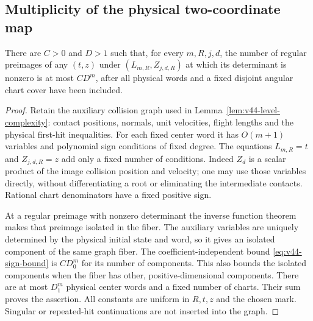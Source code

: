 \subsection{Multiplicity of the physical two-coordinate map}
\begin{lemma}
\label{lem:v61-clearance-multiplicity}
There are $C>0$ and $D>1$ such that, for every $m,R,j,d$, the number
of regular preimages of any $(t,z)$ under
$(L_{m,R},Z_{j,d,R})$ at which its determinant is nonzero is at most
$CD^m$, after all physical words and a fixed disjoint angular chart
cover have been included.
\end{lemma}
\begin{proof}
Retain the auxiliary collision graph used in
Lemma~\ref{lem:v44-level-complexity}: contact positions, normals,
unit velocities, flight lengths and the physical first-hit inequalities.
For each fixed center word it has $O(m+1)$ variables and polynomial
sign conditions of fixed degree. The equations $L_{m,R}=t$ and
$Z_{j,d,R}=z$ add only a fixed number of conditions. Indeed $Z_d$
is a scalar product of the image collision position and velocity;
one may use those variables directly, without differentiating a root
or eliminating the intermediate contacts. Rational chart denominators
have a fixed positive sign.

At a regular preimage with nonzero determinant the inverse function
theorem makes that preimage isolated in the fiber. The auxiliary
variables are uniquely determined by the physical initial state and
word, so it gives an isolated component of the same graph fiber.
The coefficient-independent bound \eqref{eq:v44-sign-bound} is
$CD_0^m$ for its number of components. This also bounds the isolated
components when the fiber has other, positive-dimensional components.
There are at most $D_1^m$ physical center words and a fixed number
of charts. Their sum proves the assertion. All constants are uniform
in $R,t,z$ and the chosen mark. Singular or repeated-hit continuations
are not inserted into the graph.
\end{proof}

